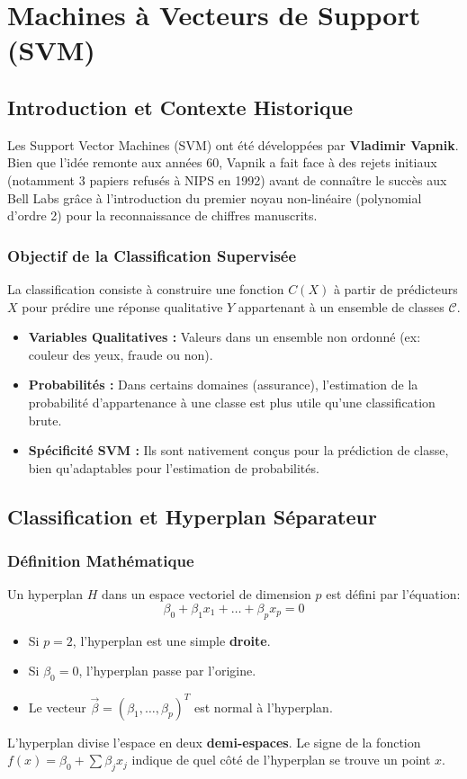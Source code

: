\chapter{Machines à Vecteurs de Support (SVM)}
\section{Introduction et Contexte Historique}
Les Support Vector Machines (SVM) ont été développées par \textbf{Vladimir Vapnik}. Bien que l'idée remonte aux années 60, Vapnik a fait face à des rejets initiaux (notamment 3 papiers refusés à NIPS en 1992) avant de connaître le succès aux Bell Labs grâce à l'introduction du premier noyau non-linéaire (polynomial d'ordre 2) pour la reconnaissance de chiffres manuscrits.

\subsection{Objectif de la Classification Supervisée}
La classification consiste à construire une fonction $C(X)$ à partir de prédicteurs $X$ pour prédire une réponse qualitative $Y$ appartenant à un ensemble de classes $\mathcal{C}$.
\begin{itemize}
    \item \textbf{Variables Qualitatives :} Valeurs dans un ensemble non ordonné (ex: couleur des yeux, fraude ou non).
    \item \textbf{Probabilités :} Dans certains domaines (assurance), l'estimation de la probabilité d'appartenance à une classe est plus utile qu'une classification brute.
    \item \textbf{Spécificité SVM :} Ils sont nativement conçus pour la prédiction de classe, bien qu'adaptables pour l'estimation de probabilités.
\end{itemize}

\section{Classification et Hyperplan Séparateur}

\subsection{Définition Mathématique}
Un hyperplan $H$ dans un espace vectoriel de dimension $p$ est défini par l'équation:
\begin{equation}
\beta_{0} + \beta_{1}x_{1} + \dots + \beta_{p}x_{p} = 0
\end{equation}
\begin{itemize}
    \item Si $p=2$, l'hyperplan est une simple \textbf{droite}.
    \item Si $\beta_{0}=0$, l'hyperplan passe par l'origine.
    \item Le vecteur $\vec{\beta} = (\beta_{1}, \dots, \beta_{p})^{T}$ est normal à l'hyperplan.
\end{itemize}
L'hyperplan divise l'espace en deux \textbf{demi-espaces}. Le signe de la fonction $f(x) = \beta_{0} + \sum \beta_{j}x_{j}$ indique de quel côté de l'hyperplan se trouve un point $x$.

